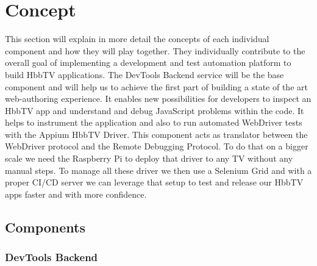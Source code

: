 %
%

\chapter{Concept\label{cha:concept}}

This section will explain in more detail the concepts of each individual component and how they will
play together. They individually contribute to the overall goal of implementing a development and
test automation platform to build HbbTV applications. The DevTools Backend service will be the base
component and will help us to achieve the first part of building a state of the art web-authoring
experience. It enables new possibilities for developers to inspect an HbbTV app and understand and debug
JavaScript problems within the code. It helps to instrument the application and also to run automated
WebDriver tests with the Appium HbbTV Driver. This component acts as translator between the WebDriver
protocol and the Remote Debugging Protocol. To do that on a bigger scale we need the Raspberry Pi to
deploy that driver to any TV without any manual steps. To manage all these driver we then use a
Selenium Grid and with a proper CI/CD server we can leverage that setup to test and release our HbbTV
apps faster and with more confidence.

\section{Components\label{sec:components}}

\subsection{DevTools Backend\label{sec:devtoolsbackend}}

